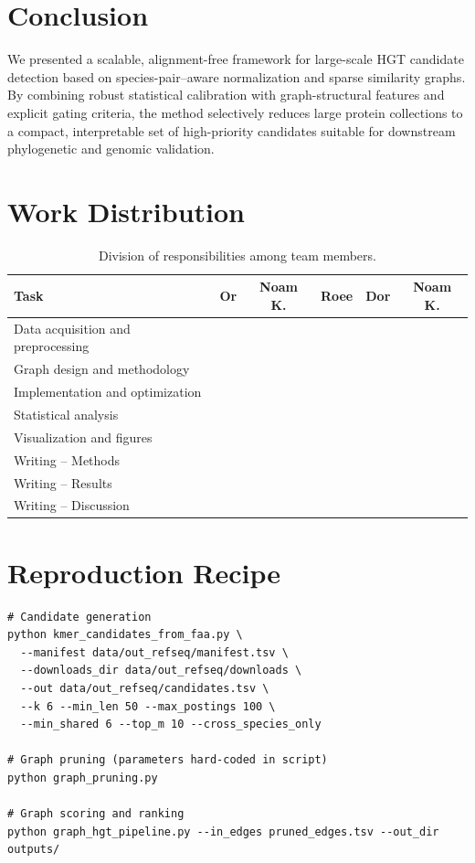 \documentclass[11pt]{article}
\begin{document}
\section{Conclusion}

We presented a scalable, alignment-free framework for large-scale HGT candidate detection based on species-pair–aware normalization and sparse similarity graphs. By combining robust statistical calibration with graph-structural features and explicit gating criteria, the method selectively reduces large protein collections to a compact, interpretable set of high-priority candidates suitable for downstream phylogenetic and genomic validation.

\section*{Work Distribution}
\begin{table}[h]
\centering
\begin{tabular}{lccccc}
\hline
Task & Or & Noam K. & Roee & Dor & Noam K. \\
\hline
Data acquisition and preprocessing &  &  &  &  &  \\
Graph design and methodology &  &  &  &  &  \\
Implementation and optimization &  &  &  &  &  \\
Statistical analysis &  &  &  &  &  \\
Visualization and figures &  &  &  &  &  \\
Writing – Methods &  &  &  &  &  \\
Writing – Results &  &  &  &  &  \\
Writing – Discussion &  &  &  &  &  \\
\hline
\end{tabular}
\caption{Division of responsibilities among team members.}
\end{table}

\appendix
\section{Reproduction Recipe}
\begin{verbatim}
# Candidate generation
python kmer_candidates_from_faa.py \
  --manifest data/out_refseq/manifest.tsv \
  --downloads_dir data/out_refseq/downloads \
  --out data/out_refseq/candidates.tsv \
  --k 6 --min_len 50 --max_postings 100 \
  --min_shared 6 --top_m 10 --cross_species_only

# Graph pruning (parameters hard-coded in script)
python graph_pruning.py

# Graph scoring and ranking
python graph_hgt_pipeline.py --in_edges pruned_edges.tsv --out_dir outputs/
\end{verbatim}



\end{document}
